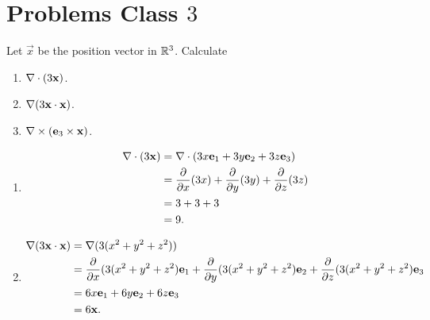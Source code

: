 \documentclass[10pt, a4paper]{article}
\begin{document}
\newpage

\section{Problems Class \texorpdfstring{$3$}{}}

\begin{problem}[$2007$ Question $1$]
    Let $\vec{x}$ be the position vector in $\mathbb{R} ^ 3$.
    Calculate
    \begin{enumerate}[label = (\roman*)]
        \item $\mathbf{\nabla} \cdot (3\mathbf{x})$.

        \item $\mathbf{\nabla} (3\mathbf{x} \cdot \mathbf{x})$.
        
        \item $\mathbf{\nabla} \times (\mathbf{e}_3 \times \mathbf{x})$.
    \end{enumerate}

    \begin{solution}
        \begin{enumerate}[label = (\roman*)]
            \item
            \begin{align*}
                \mathbf{\nabla} \cdot (3\mathbf{x}) &= \mathbf{\nabla} \cdot (3x\mathbf{e}_1 + 3y\mathbf{e}_2 + 3z\mathbf{e}_3) \\
                &= \frac{\partial }{\partial x}(3x) + \frac{\partial }{\partial y}(3y) + \frac{\partial }{\partial z}(3z) \\
                &= 3 + 3 + 3 \\
                &= 9.
            \end{align*}

            \item
            \begin{align*}
                \mathbf{\nabla} (3\mathbf{x} \cdot \mathbf{x}) &= \mathbf{\nabla}(3(x ^ 2 + y ^ 2 + z ^ 2)) \\
                &= \frac{\partial }{\partial x}(3(x ^ 2 + y ^ 2 + z ^ 2)\mathbf{e}_1 + \frac{\partial }{\partial y}(3(x ^ 2 + y ^ 2 + z ^ 2)\mathbf{e}_2 + \frac{\partial }{\partial z}(3(x ^ 2 + y ^ 2 + z ^ 2)\mathbf{e}_3 \\
                &= 6x\mathbf{e}_1 + 6y\mathbf{e}_2 + 6z\mathbf{e}_3 \\
                &= 6\mathbf{x}.
            \end{align*}


\end{enumerate}
\end{solution}
\end{problem}
\end{document}
